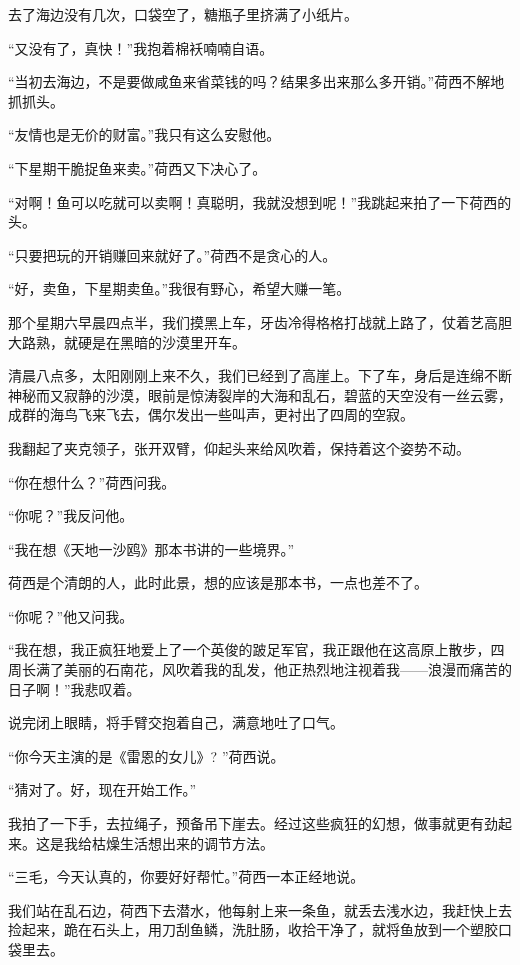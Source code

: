\par 去了海边没有几次，口袋空了，糖瓶子里挤满了小纸片。
\par “又没有了，真快！”我抱着棉袄喃喃自语。
\par “当初去海边，不是要做咸鱼来省菜钱的吗？结果多出来那么多开销。”荷西不解地抓抓头。
\par “友情也是无价的财富。”我只有这么安慰他。
\par “下星期干脆捉鱼来卖。”荷西又下决心了。
\par “对啊！鱼可以吃就可以卖啊！真聪明，我就没想到呢！”我跳起来拍了一下荷西的头。
\par “只要把玩的开销赚回来就好了。”荷西不是贪心的人。
\par “好，卖鱼，下星期卖鱼。”我很有野心，希望大赚一笔。
\par 那个星期六早晨四点半，我们摸黑上车，牙齿冷得格格打战就上路了，仗着艺高胆大路熟，就硬是在黑暗的沙漠里开车。
\par 清晨八点多，太阳刚刚上来不久，我们已经到了高崖上。下了车，身后是连绵不断神秘而又寂静的沙漠，眼前是惊涛裂岸的大海和乱石，碧蓝的天空没有一丝云雾，成群的海鸟飞来飞去，偶尔发出一些叫声，更衬出了四周的空寂。
\par 我翻起了夹克领子，张开双臂，仰起头来给风吹着，保持着这个姿势不动。
\par “你在想什么？”荷西问我。
\par “你呢？”我反问他。
\par “我在想《天地一沙鸥》那本书讲的一些境界。”
\par 荷西是个清朗的人，此时此景，想的应该是那本书，一点也差不了。
\par “你呢？”他又问我。
\par “我在想，我正疯狂地爱上了一个英俊的跛足军官，我正跟他在这高原上散步，四周长满了美丽的石南花，风吹着我的乱发，他正热烈地注视着我——浪漫而痛苦的日子啊！”我悲叹着。
\par 说完闭上眼睛，将手臂交抱着自己，满意地吐了口气。
\par “你今天主演的是《雷恩的女儿》? ”荷西说。
\par “猜对了。好，现在开始工作。”
\par 我拍了一下手，去拉绳子，预备吊下崖去。经过这些疯狂的幻想，做事就更有劲起来。这是我给枯燥生活想出来的调节方法。
\par “三毛，今天认真的，你要好好帮忙。”荷西一本正经地说。
\par 我们站在乱石边，荷西下去潜水，他每射上来一条鱼，就丢去浅水边，我赶快上去捡起来，跪在石头上，用刀刮鱼鳞，洗肚肠，收拾干净了，就将鱼放到一个塑胶口袋里去。
